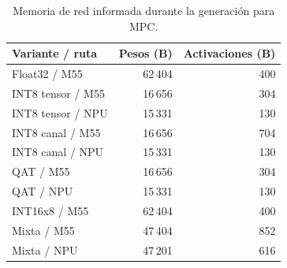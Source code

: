 \begin{table}[H]
\centering\small
\caption{Memoria de red informada durante la generación para MPC.}\label{tab:mpc_memoria}
\begin{tabularx}{\linewidth}{Yrr}\toprule
Variante / ruta & Pesos (B) & Activaciones (B)\\\midrule
Float32 / M55 & 62\,404 & 400\\
INT8 tensor / M55 & 16\,656 & 304\\
INT8 tensor / NPU & 15\,331 & 130\\
INT8 canal / M55 & 16\,656 & 704\\
INT8 canal / NPU & 15\,331 & 130\\
QAT / M55 & 16\,656 & 304\\
QAT / NPU & 15\,331 & 130\\
INT16x8 / M55 & 62\,404 & 400\\
Mixta / M55 & 47\,404 & 852\\
Mixta / NPU & 47\,201 & 616\\
\bottomrule\end{tabularx}
\end{table}
